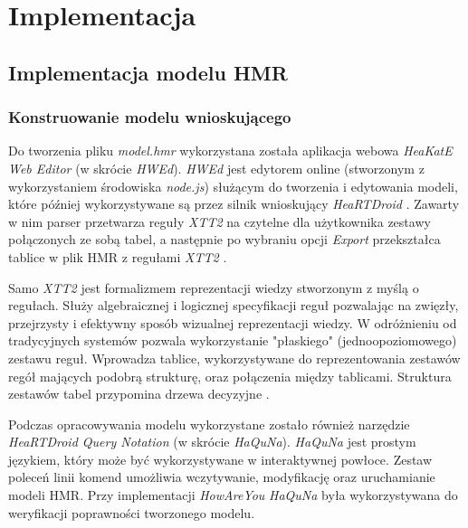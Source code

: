 \chapter{Implementacja}
\label{cha:implementacja}



\section{Implementacja modelu HMR}
\label{sec:implementacjaModeluHmr}

\subsection{Konstruowanie modelu wnioskującego}

Do tworzenia pliku \textit{model.hmr} wykorzystana została aplikacja webowa \textit{HeaKatE Web Editor} (w skrócie \textit{HWEd}). \textit{HWEd} jest edytorem online (stworzonym z wykorzystaniem środowiska \textit{node.js}) służącym do tworzenia i edytowania modeli, które później wykorzystywane są przez silnik wnioskujący \textit{HeaRTDroid} \cite{heartdroid}. Zawarty w nim parser przetwarza reguły \textit{XTT2} na czytelne dla użytkownika zestawy połączonych ze sobą tabel, a następnie po wybraniu opcji \textit{Export} przekształca tablice w plik HMR z regułami \textit{XTT2} \cite{heartdroid}.

Samo \textit{XTT2} jest formalizmem reprezentacji wiedzy stworzonym z myślą o regułach. Służy algebraicznej i logicznej specyfikacji reguł pozwalając na zwięzły, przejrzysty i efektywny sposób wizualnej reprezentacji wiedzy. W odróżnieniu od tradycyjnych systemów pozwala wykorzystanie "płaskiego" (jednoopoziomowego) zestawu reguł. Wprowadza tablice, wykorzystywane do reprezentowania zestawów regół mających podobrą strukturę, oraz połączenia między tablicami. Struktura zestawów tabel przypomina drzewa decyzyjne \cite{AiWikiHekate}.

Podczas opracowywania modelu wykorzystane zostało również narzędzie \textit{HeaRTDroid Query Notation} (w skrócie \textit{HaQuNa}). \textit{HaQuNa} jest prostym językiem, który może być wykorzystywane w interaktywnej powłoce. Zestaw poleceń linii komend umożliwia wczytywanie, modyfikację oraz uruchamianie modeli HMR\cite{heartdroid}. Przy implementacji \textit{HowAreYou} \textit{HaQuNa} była wykorzystywana do weryfikacji poprawności tworzonego modelu.

